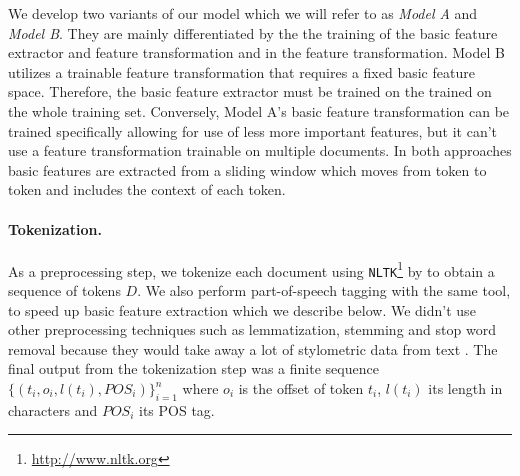 \documentclass[10pt, a4paper]{article}
\begin{document}
We develop two variants of our model which we will refer to as \emph{Model A} and \emph{Model B}. They are mainly differentiated by the the training of the basic feature extractor and feature transformation and in the feature transformation. Model B utilizes a trainable feature transformation that requires a fixed basic feature space. Therefore, the basic feature extractor must be trained on the trained on the whole training set. Conversely, Model A's basic feature transformation can be trained specifically allowing for use of less more important features, but it can't use a feature transformation trainable on multiple documents. In both approaches basic features are extracted from a sliding window which moves from token to token and includes the context of each token.

\paragraph{Tokenization.} As a preprocessing step, we tokenize each document using \texttt{NLTK}\footnote{\url{http://www.nltk.org}} by \citet{bird-2009} to obtain a sequence of tokens $D$. We also perform part-of-speech tagging with the same tool, to speed up basic feature extraction which we describe below. We didn't use other preprocessing techniques such as lemmatization, stemming and stop word removal because they would take away a lot of stylometric data from text \cite{stamatatos-2009a}. The final output from the tokenization step was a finite sequence $\{(t_i, o_i, l(t_i), \mathit{POS}_i)\}_{i=1}^n$ where $o_i$ is the offset of token $t_i$, $l(t_i)$ its length in characters and $\mathit{POS}_i$ its POS tag.
\end{document}
